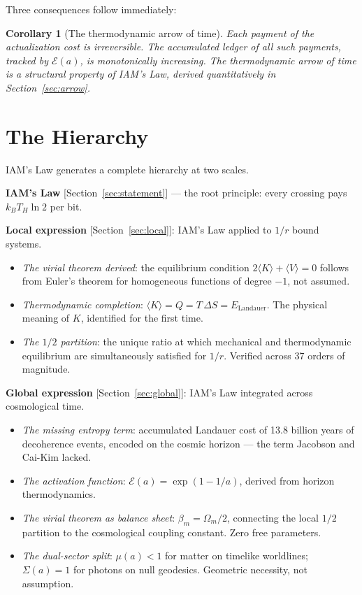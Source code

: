 \documentclass[12pt,a4paper]{article}
\newtheorem{corollary}{Corollary}
\begin{document}
\medskip

Three consequences follow immediately:

\begin{corollary}[The thermodynamic arrow of time]
Each payment of the actualization cost is irreversible. The
accumulated ledger of all such payments, tracked by
$\mathcal{E}(a)$, is monotonically increasing. The thermodynamic
arrow of time is a structural property of IAM's Law, derived
quantitatively in Section~\ref{sec:arrow}.
\end{corollary}

\section{The Hierarchy}
\label{sec:hierarchy}

IAM's Law generates a complete hierarchy at two scales.

\medskip
\noindent\textbf{IAM's Law} [Section~\ref{sec:statement}] ---
the root principle: every crossing pays $k_B T_H \ln 2$ per bit.

\medskip
\noindent\textbf{Local expression} [Section~\ref{sec:local}]:
IAM's Law applied to $1/r$ bound systems.
\begin{itemize}
\item \textit{The virial theorem derived}: the equilibrium condition
  $2\langle K \rangle + \langle V \rangle = 0$ follows from Euler's
  theorem for homogeneous functions of degree $-1$, not assumed.
\item \textit{Thermodynamic completion}: $\langle K \rangle = Q =
  T\,\Delta S = E_\mathrm{Landauer}$. The physical meaning of $K$,
  identified for the first time.
\item \textit{The $1/2$ partition}: the unique ratio at which
  mechanical and thermodynamic equilibrium are simultaneously
  satisfied for $1/r$. Verified across 37 orders of magnitude.
\end{itemize}

\medskip
\noindent\textbf{Global expression} [Section~\ref{sec:global}]:
IAM's Law integrated across cosmological time.
\begin{itemize}
\item \textit{The missing entropy term}: accumulated Landauer cost
  of 13.8 billion years of decoherence events, encoded on the
  cosmic horizon --- the term Jacobson and Cai-Kim lacked.
\item \textit{The activation function}: $\mathcal{E}(a) =
  \exp(1-1/a)$, derived from horizon thermodynamics.
\item \textit{The virial theorem as balance sheet}: $\beta_m =
  \Omega_m/2$, connecting the local $1/2$ partition to the
  cosmological coupling constant. Zero free parameters.
\item \textit{The dual-sector split}: $\mu(a) < 1$ for matter
  on timelike worldlines; $\Sigma(a) = 1$ for photons on null
  geodesics. Geometric necessity, not assumption.
\end{itemize}
\end{document}

